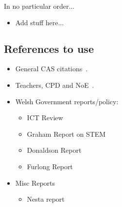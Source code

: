 \documentclass{sig-alternate}
\begin{document}
In no particular order...

\begin{itemize}
\item Add stuff here...
\end{itemize}

\subsection*{References to use}
\begin{itemize}
\item
General CAS
citations~\cite{crick+sentance:2011,brown-et-al-sigcse2012,brown-et-al-toce2014}.

\item
Teachers, CPD and
NoE~\cite{sentance-et-al-wipsce2012,sentance-et-al:2013,sentance-et-al:2014}.

\item
Welsh Government reports/policy:
\begin{itemize}
\item
ICT Review~\cite{welshictreview:2013}
\item
Graham Report on STEM~\cite{STEMreview:2014}
\item
Donaldson Report~\cite{Donaldson:2015}
\item
Furlong Report~\cite{Furlong:2015}
\end{itemize}

\item
Misc Reports
\begin{itemize}
\item
Nesta report~\cite{NESTA:2015}

\end{itemize}
\end{itemize}
\end{document}

